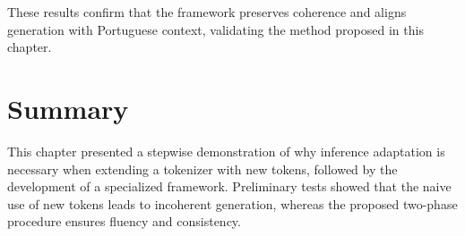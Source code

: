 These results confirm that the framework preserves coherence and aligns generation with Portuguese context, validating the method proposed in this chapter.

\section{Summary}
This chapter presented a stepwise demonstration of why inference adaptation is necessary when extending a tokenizer with new tokens, followed by the development of a specialized framework. Preliminary tests showed that the naive use of new tokens leads to incoherent generation, whereas the proposed two-phase procedure ensures fluency and consistency.
